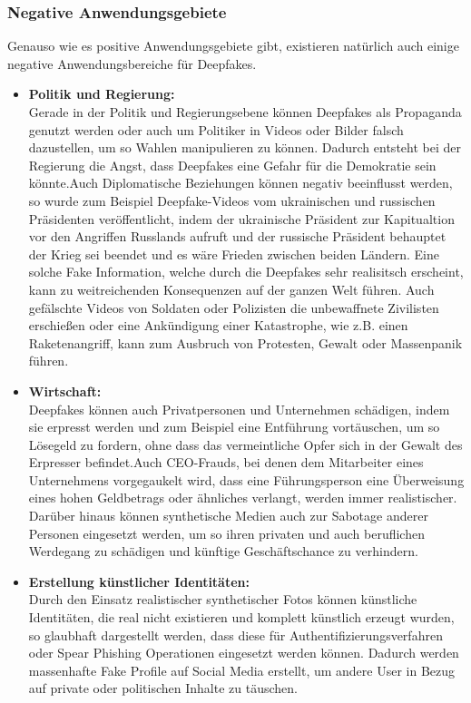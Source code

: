 \subsubsection*{Negative Anwendungsgebiete}
Genauso wie es positive Anwendungsgebiete gibt, existieren natürlich auch einige negative Anwendungsbereiche für Deepfakes.
\begin{itemize}
    \item \textbf{Politik und Regierung:} \\
    Gerade in der Politik und Regierungsebene können Deepfakes als Propaganda genutzt werden oder auch um Politiker in Videos oder Bilder falsch dazustellen, um so Wahlen manipulieren zu können. Dadurch entsteht bei der Regierung die Angst, dass Deepfakes eine Gefahr für die Demokratie sein könnte.\cite{ResearchGate}\newline Auch Diplomatische Beziehungen können negativ beeinflusst werden, so wurde zum Beispiel Deepfake-Videos vom ukrainischen und russischen Präsidenten veröffentlicht, indem der ukrainische Präsident zur Kapitualtion vor den Angriffen Russlands aufruft und der russische Präsident behauptet der Krieg sei beendet und es wäre Frieden zwischen beiden Ländern. Eine solche Fake Information, welche durch die Deepfakes sehr realisitsch erscheint, kann zu weitreichenden Konsequenzen auf der ganzen Welt führen. Auch gefälschte Videos von Soldaten oder Polizisten die unbewaffnete Zivilisten erschießen oder eine Ankündigung einer Katastrophe, wie z.B. einen Raketenangriff, kann zum Ausbruch von Protesten, Gewalt oder Massenpanik führen.\cite{SpringerLink}
    \item \textbf{Wirtschaft:} \\
    Deepfakes können auch Privatpersonen und Unternehmen schädigen, indem sie erpresst werden und zum Beispiel eine Entführung vortäuschen, um so Lösegeld zu fordern, ohne dass das vermeintliche Opfer sich in der Gewalt des Erpresser befindet.\newline Auch CEO-Frauds, bei denen dem Mitarbeiter eines Unternehmens vorgegaukelt wird, dass eine Führungsperson eine Überweisung eines hohen Geldbetrags oder ähnliches verlangt, werden immer realistischer. Darüber hinaus können synthetische Medien auch zur Sabotage anderer Personen eingesetzt werden, um so ihren privaten und auch beruflichen Werdegang zu schädigen und künftige Geschäftschance zu verhindern.\cite{SpringerLink}
    \item \textbf{Erstellung künstlicher Identitäten:} \\
    Durch den Einsatz realistischer synthetischer Fotos können künstliche Identitäten, die real nicht existieren und komplett künstlich erzeugt wurden, so glaubhaft dargestellt werden, dass diese für Authentifizierungsverfahren oder Spear Phishing Operationen eingesetzt werden können. Dadurch werden massenhafte Fake Profile auf Social Media erstellt, um andere User in Bezug auf private oder politischen Inhalte zu täuschen.\cite{SpringerLink}

\end{itemize}
